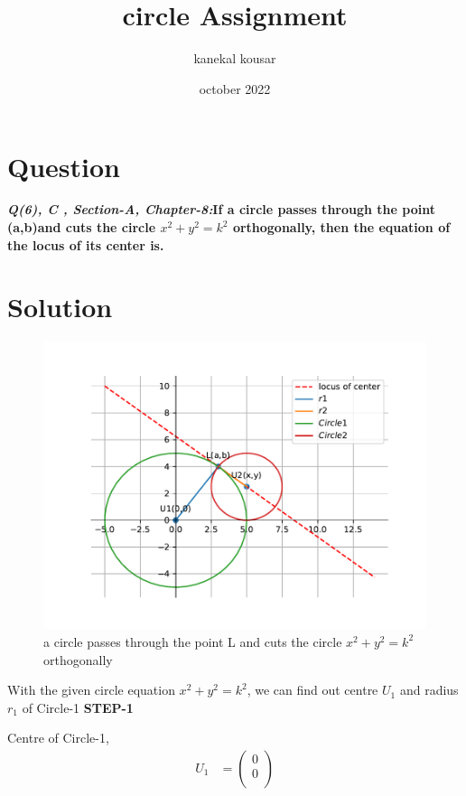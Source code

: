 \documentclass[journal,12pt,twocolumn]{IEEEtran}
\begin{document}
\title{\textbf{\\circle Assignment}}
\author{kanekal kousar}
\date{october 2022}

\maketitle


\section{Question}
\textbf{\textit{Q(6), C , Section-A, Chapter-8:}If a circle passes through the point (a,b)and cuts the circle {$x^2+y^2=k^2$} orthogonally, then the equation of the locus of its center is.}

\section{Solution}
\raggedright 

\begin{figure}[h!]
\centering
\includegraphics[scale=0.6]{code/cir.pdf}  
\centering
\caption{a circle passes through the point L and cuts the circle {$x^2+y^2=k^2$} orthogonally}
\end{figure}

\vspace{0.25cm}
With the given circle equation {$x^2+y^2=k^2$}, we can find out centre \(U_1\) and radius \(r_1\) of Circle-1
\vspace{0.25cm}
\textbf{STEP-1}

Centre of Circle-1,
\boldmath 
\begin{align} 
U_1 &= \begin{pmatrix}0 \\ 0 \\ \end{pmatrix} 
\end{align}
\unboldmath
\end{document}
